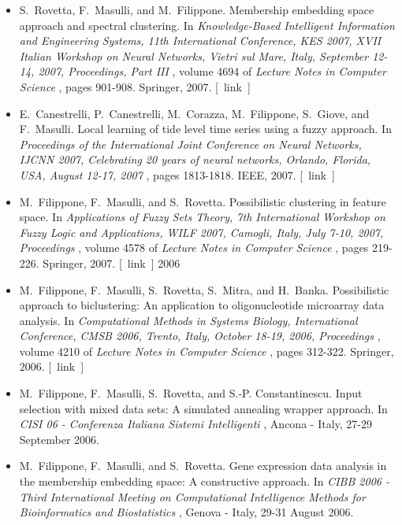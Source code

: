 \documentclass[10pt]{article}
\begin{document}
\begin{itemize}
\item 

  S. Rovetta, F. Masulli, and M. Filippone. Membership embedding space approach and spectral clustering. In \emph{Knowledge-Based Intelligent Information and Engineering Systems, 11th International Conference, KES 2007, XVII Italian Workshop on Neural Networks, Vietri sul Mare, Italy, September 12-14, 2007, Proceedings, Part III}
, volume 4694 of \emph{Lecture Notes in Computer Science}
, pages 901-908. Springer, 2007. [ link ] 

\item 

  E. Canestrelli, P. Canestrelli, M. Corazza, M. Filippone, S. Giove, and F. Masulli. Local learning of tide level time series using a fuzzy approach. In \emph{Proceedings of the International Joint Conference on Neural Networks, IJCNN 2007, Celebrating 20 years of neural networks, Orlando, Florida, USA, August 12-17, 2007}
, pages 1813-1818. IEEE, 2007. [ link ] 

\item 

  M. Filippone, F. Masulli, and S. Rovetta. Possibilistic clustering in feature space. In \emph{Applications of Fuzzy Sets Theory, 7th International Workshop on Fuzzy Logic and Applications, WILF 2007, Camogli, Italy, July 7-10, 2007, Proceedings}
, volume 4578 of \emph{Lecture Notes in Computer Science}
, pages 219-226. Springer, 2007. [ link ] 
2006
\item 

  M. Filippone, F. Masulli, S. Rovetta, S. Mitra, and H. Banka. Possibilistic approach to biclustering: An application to oligonucleotide microarray data analysis. In \emph{Computational Methods in Systems Biology, International Conference, CMSB 2006, Trento, Italy, October 18-19, 2006, Proceedings}
, volume 4210 of \emph{Lecture Notes in Computer Science}
, pages 312-322. Springer, 2006. [ link ] 

\item 

  M. Filippone, F. Masulli, S. Rovetta, and S.-P. Constantinescu. Input selection with mixed data sets: A simulated annealing wrapper approach. In \emph{CISI 06 - Conferenza Italiana Sistemi Intelligenti}
, Ancona - Italy, 27-29 September 2006. 

\item 

  M. Filippone, F. Masulli, and S. Rovetta. Gene expression data analysis in the membership embedding space: A constructive approach. In \emph{CIBB 2006 - Third International Meeting on Computational Intelligence Methods for Bioinformatics and Biostatistics}
, Genova - Italy, 29-31 August 2006. 


\end{itemize}
\end{document}
